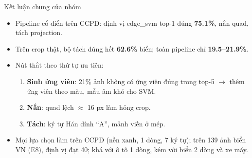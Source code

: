 \documentclass[aspectratio=169,11pt]{beamer}
\newcommand{\code}[1]{{\footnotesize\ttfamily #1}}
\newcommand{\acc}[1]{\textcolor{accent}{\textbf{#1}}}
\newcommand{\hl}[1]{\textcolor{accentdark}{\textbf{#1}}}
\begin{document}
\begin{frame}{Kết luận chung của nhóm}
  \begin{itemize}
    \item Pipeline cổ điển trên CCPD: định vị \code{edge\_svm} top-1 đúng \acc{75.1\%}, nắn quad, tách projection.
    \item Trên crop thật, bộ tách đúng hết \acc{62.6\%} biển; toàn pipeline chỉ \acc{19.5--21.9\%}.
    \item Nút thắt theo thứ tự ưu tiên:
    \begin{enumerate}
      \item \hl{Sinh ứng viên}: 21\% ảnh không có ứng viên đúng trong top-5 $\to$ thêm ứng viên theo màu, mẫu âm khó cho SVM.
      \item \hl{Nắn}: quad lệch $\approx$ 16 px làm hỏng crop.
      \item \hl{Tách}: ký tự Hán dính ``A'', mảnh viền ở mép.
    \end{enumerate}
    \item Mọi lựa chọn làm trên CCPD (nền xanh, 1 dòng, 7 ký tự); trên 139 ảnh biển VN (E8), định vị đạt 40; khá với ô tô 1 dòng, kém với biển 2 dòng và xe máy.
  \end{itemize}
\end{frame}

\begin{frame}[plain]
\end{frame}
\end{document}
